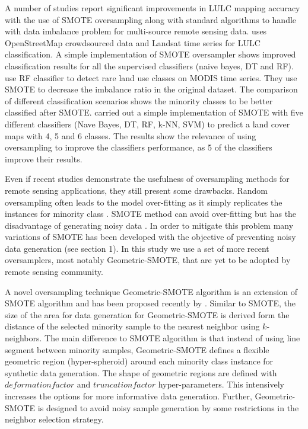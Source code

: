 \documentclass[parskip=full]{scrartcl}
\begin{document}
A number of studies report significant improvements in LULC mapping accuracy
with the use of SMOTE oversampling along with standard algorithms to handle 
with data imbalance problem for multi-source remote sensing data. 
\cite{Johnson2016} uses OpenStreetMap crowdsourced data and Landsat time series 
for LULC classification. A simple implementation of SMOTE oversampler shows 
improved classification results for all the supervised classifiers (naive 
bayes, DT and RF). \cite{Bogner2018} use RF classifier to detect rare land use 
classes on MODIS time series. They use SMOTE to decrease the imbalance ratio
in the original dataset. The comparison of different classification scenarios 
shows the minority classes to be better classified after SMOTE. 
\cite{Panda2018} carried out a simple implementation of SMOTE with five 
different classifiers (Nave Bayes, DT, RF, k-NN, SVM) to predict a land cover 
maps with 4, 5 and 6 classes. The results show the relevance of using 
oversampling to improve the classifiers performance, as 5 of the classifiers 
improve their results.

Even if recent studies demonstrate the usefulness of oversampling methods
for remote sensing applications, they still present some drawbacks. Random
oversampling often leads to the model over-fitting as it simply replicates the
instances for minority class \cite{Feng2019}. SMOTE method can avoid
over-fitting but has the disadvantage of generating noisy data \cite{He2008}.
In order to mitigate this problem many variations of SMOTE has been developed
with the objective of preventing noisy data generation (see section 1). In this 
study we use a set of more recent oversamplers, most notably Geometric-SMOTE, 
that are yet to be adopted by remote sensing community. 

A novel oversampling technique Geometric-SMOTE algorithm is an extension of 
SMOTE algorithm and has been proposed recently by \cite{Douzas2019}. Similar to 
SMOTE, the size of the area for data generation for Geometric-SMOTE is derived 
form the distance of the selected minority sample to the nearest neighbor using 
$k$-neighbors. The main difference to SMOTE algorithm is that instead of using 
line segment between minority samples, Geometric-SMOTE defines a flexible 
geometric region (hyper-spheroid) around each minority class instance for 
synthetic data generation. The shape of geometric regions are defined with 
$deformation factor$ and $truncation factor$ hyper-parameters. This intensively 
increases the options for more informative data generation. Further, 
Geometric-SMOTE is designed to avoid noisy sample generation by some 
restrictions in the neighbor selection strategy.
\end{document}
